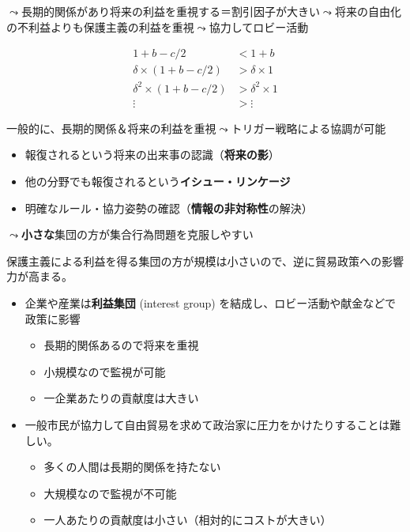 \documentclass[
  xelatex,
  ja=standard]{bxjsarticle}
\providecommand{\tightlist}{%
  \setlength{\itemsep}{0pt}\setlength{\parskip}{0pt}}\usepackage{longtable,booktabs,array}
\begin{document}
\(\leadsto\)長期的関係があり将来の利益を重視する＝割引因子が大きい\(\leadsto\)将来の自由化の不利益よりも保護主義の利益を重視\(\leadsto\)協力してロビー活動

\[
\begin{split}
1+b-c/2 &< 1+b \\
\delta \times (1+b-c/2) &> \delta \times 1 \\
\delta^2 \times (1+b-c/2) &> \delta^2 \times 1 \\
\vdots &> \vdots 
\end{split}
\]

一般的に、長期的関係＆将来の利益を重視\(\leadsto\)トリガー戦略による協調が可能

\begin{itemize}
\tightlist
\item
  報復されるという将来の出来事の認識（\textbf{将来の影}）
\item
  他の分野でも報復されるという\textbf{イシュー・リンケージ}
\item
  明確なルール・協力姿勢の確認（\textbf{情報の非対称性}の解決）
\end{itemize}

\(\leadsto\)\textbf{小さな}集団の方が集合行為問題を克服しやすい\citep{olson1996}

保護主義による利益を得る集団の方が規模は小さいので、逆に貿易政策への影響力が高まる。

\begin{itemize}
\tightlist
\item
  企業や産業は\textbf{利益集団} (interest group)
  を結成し、ロビー活動や献金などで政策に影響

  \begin{itemize}
  \tightlist
  \item
    長期的関係あるので将来を重視
  \item
    小規模なので監視が可能
  \item
    一企業あたりの貢献度は大きい
  \end{itemize}
\item
  一般市民が協力して自由貿易を求めて政治家に圧力をかけたりすることは難しい。

  \begin{itemize}
  \tightlist
  \item
    多くの人間は長期的関係を持たない
  \item
    大規模なので監視が不可能
  \item
    一人あたりの貢献度は小さい（相対的にコストが大きい）
  \end{itemize}
\end{itemize}
\end{document}
